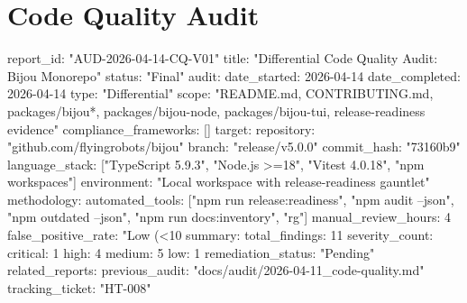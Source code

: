 \chapter{Code Quality Audit}\label{record-416}

\smallskip

\begin{RecordMeta}
report_id: "AUD-2026-04-14-CQ-V01"
title: "Differential Code Quality Audit: Bijou Monorepo"
status: "Final"
audit:
  date_started: 2026-04-14
  date_completed: 2026-04-14
  type: "Differential"
  scope: "README.md, CONTRIBUTING.md, packages/bijou*, packages/bijou-node, packages/bijou-tui, release-readiness evidence"
  compliance_frameworks: []
target:
  repository: "github.com/flyingrobots/bijou"
  branch: "release/v5.0.0"
  commit_hash: "73160b9"
  language_stack: ["TypeScript 5.9.3", "Node.js >=18", "Vitest 4.0.18", "npm workspaces"]
  environment: "Local workspace with release-readiness gauntlet"
methodology:
  automated_tools: ["npm run release:readiness", "npm audit --json", "npm outdated --json", "npm run docs:inventory", "rg"]
  manual_review_hours: 4
  false_positive_rate: "Low (<10%
summary:
  total_findings: 11
  severity_count:
    critical: 1
    high: 4
    medium: 5
    low: 1
  remediation_status: "Pending"
related_reports:
  previous_audit: "docs/audit/2026-04-11_code-quality.md"
  tracking_ticket: "HT-008"

\end{RecordMeta}

